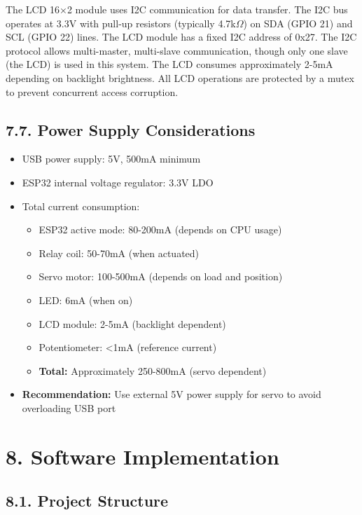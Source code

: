 \documentclass[12pt]{article}
\begin{document}
The LCD 16×2 module uses I2C communication for data transfer. The I2C bus operates at 3.3V with pull-up resistors (typically 4.7k$\Omega$) on SDA (GPIO 21) and SCL (GPIO 22) lines. The LCD module has a fixed I2C address of 0x27. The I2C protocol allows multi-master, multi-slave communication, though only one slave (the LCD) is used in this system. The LCD consumes approximately 2-5mA depending on backlight brightness. All LCD operations are protected by a mutex to prevent concurrent access corruption.

\subsection*{7.7. Power Supply Considerations}

\begin{itemize}
    \item USB power supply: 5V, 500mA minimum
    \item ESP32 internal voltage regulator: 3.3V LDO
    \item Total current consumption:
    \begin{itemize}
        \item ESP32 active mode: 80-200mA (depends on CPU usage)
        \item Relay coil: 50-70mA (when actuated)
        \item Servo motor: 100-500mA (depends on load and position)
        \item LED: 6mA (when on)
        \item LCD module: 2-5mA (backlight dependent)
        \item Potentiometer: <1mA (reference current)
        \item \textbf{Total:} Approximately 250-800mA (servo dependent)
    \end{itemize}
    \item \textbf{Recommendation:} Use external 5V power supply for servo to avoid overloading USB port
\end{itemize}

\section*{8. Software Implementation}

\subsection*{8.1. Project Structure}
\end{document}
